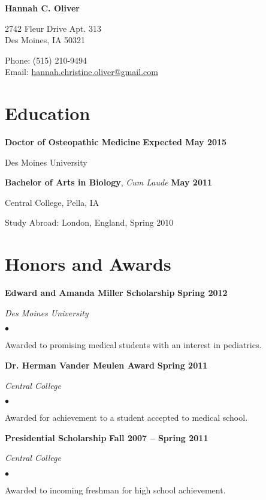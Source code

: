 \documentclass[11pt,letterpaper]{article}
\def\name{Hannah C. Oliver}
\renewenvironment{itemize}{
  \begin{list}{}{
      \setlength{\leftmargin}{1.5em}
      \setlength{\itemsep}{0.25em}
      \setlength{\parskip}{0pt}
      \setlength{\parsep}{0.25em}
    }
  }{
  \end{list}
}
\newenvironment{bitemize}{
  \begin{list}{$\bullet$}{
      \setlength{\leftmargin}{1.5em}
      \setlength{\itemsep}{0.25em}
      \setlength{\parskip}{0pt}
      \setlength{\parsep}{0.25em}
    }
  }{
  \end{list}
}
\newcommand{\yearrange}[1]{\hfill \textbf{#1} \par}
\begin{document}

\centerline{\huge \bf \name}

\bigskip

\begin{minipage}[t]{0.5\textwidth}
  2742 Fleur Drive  Apt. 313 \\
  Des Moines, IA 50321
\end{minipage}
\begin{minipage}[t]{0.5\textwidth}
  \hfill Phone: (515) 210-9494\\
  \hspace*{0pt} \hfill Email: \href{mailto:hannah.christine.oliver@gmail.com}{hannah.christine.oliver@gmail.com}
\end{minipage}

\section*{Education}

\begin{itemize}
\item \textbf{Doctor of Osteopathic Medicine} \yearrange{Expected May 2015} \par
  Des Moines University 
\item \textbf{Bachelor of Arts in Biology}, \textit{Cum Laude} \yearrange{May 2011} \par
  Central College, Pella, IA
\begin{itemize} 
  \item {Study Abroad:} London, England, Spring 2010
  \end{itemize}
\end{itemize}

\section*{Honors and Awards}
\begin{itemize}
\item \textbf{Edward and Amanda Miller Scholarship} \yearrange{Spring 2012}
  \textit{Des Moines University}
  \begin{bitemize}
    \item Awarded to promising medical students with an interest in pediatrics.
  \end{bitemize}
\item \textbf{Dr. Herman Vander Meulen Award} \yearrange{Spring 2011}
  \textit{Central College}
  \begin{bitemize}
    \item Awarded for achievement to a student accepted to medical school.
  \end{bitemize}
	
\item \textbf{Presidential Scholarship} \yearrange{Fall 2007 -- Spring 2011}
  \textit{Central College}
  \begin{bitemize}
    \item Awarded to incoming freshman for high school achievement.
  \end{bitemize}
\end{itemize}
\end{document}
